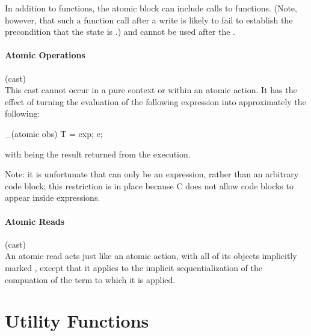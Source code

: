 \documentclass[preprint,nocopyrightspace]{sigplanconf}
\newcommand{\subsubsubsection}[1]{\paragraph{#1}}
\begin{document}
{{{{\begin{VCC}
In addition to  functions, the atomic block can
include calls to  functions. (Note, however, that such a
function call after a write is likely to fail to establish the
precondition that the state is .) 
and  cannot be used after the .

\subsubsubsection{Atomic Operations}

\noindent{} (cast)\\
This cast cannot occur in a pure context or within an atomic action.
It has the effect of turning the evaluation of the following
expression  into approximately the following:
\begin{VCC}
_(atomic obs) {
  T \result = exp;
  e;
}
\end{VCC}
with \vcc{\result} being the result returned from the execution. 

Note: it is unfortunate that  can only be an expression, rather
than an arbitrary code block; this restriction is in place because C
does not allow code blocks to appear inside expressions. 

\subsubsubsection{Atomic Reads}

 (cast)\\
An atomic read acts just like an atomic action, with all of its
objects implicitly marked , except that it applies
to the implicit sequentialization of the compuation of the term to
which it is applied.

\section{Utility Functions}


\end{VCC}}}}}
\end{document}
